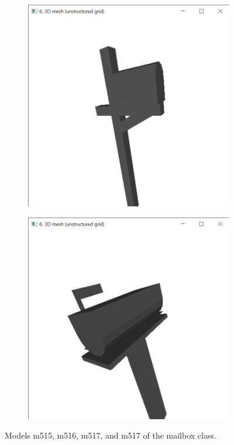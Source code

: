 \documentclass{bigdata}
\begin{document}
\begin{figure}[h!]
\begin{subfigure}[b]{0.2\linewidth}
  \end{subfigure}
  \begin{subfigure}[b]{0.2\linewidth}
    \includegraphics[width=\linewidth]{Pictures/Evaluation/mailBoxClass/stair3.png}
  \end{subfigure}
  \begin{subfigure}[b]{0.2\linewidth}
    \includegraphics[width=\linewidth]{Pictures/Evaluation/mailBoxClass/stair4.png}
  \end{subfigure}
  \caption{Models m515, m516, m517, and m517 of the mailbox class.}
  \label{fig:bunny}
\end{figure}
\end{document}
